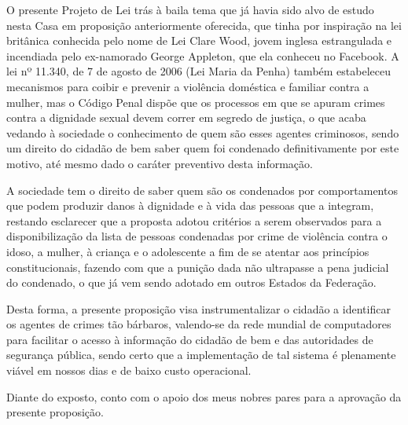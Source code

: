 \documentclass[10pt]{article}
\begin{document}
  
O presente Projeto de Lei trás à baila tema que já havia sido alvo de estudo nesta Casa em proposição anteriormente oferecida, que tinha por inspiração na lei britânica conhecida pelo nome de Lei Clare Wood, jovem inglesa estrangulada e incendiada pelo ex-namorado George Appleton, que ela conheceu no Facebook.    A lei nº 11.340, de 7 de agosto de 2006 (Lei Maria da Penha) também estabeleceu mecanismos para coibir e prevenir a violência doméstica e familiar contra a mulher, mas o Código Penal dispõe que os processos em que se apuram crimes contra a dignidade sexual devem correr em segredo de justiça, o que acaba vedando à sociedade o conhecimento de quem são esses agentes criminosos, sendo um direito do cidadão de bem saber quem foi condenado definitivamente por este motivo, até mesmo dado o caráter preventivo desta informação.

A sociedade tem o direito de saber quem são os condenados por comportamentos que podem produzir danos à dignidade e à vida das pessoas que a integram, restando esclarecer que a proposta adotou critérios a serem observados para a disponibilização da lista de pessoas condenadas por crime de violência contra o idoso, a mulher, à criança e o adolescente a fim de se atentar aos princípios constitucionais, fazendo com que a punição dada não ultrapasse a pena judicial do condenado, o que já vem sendo adotado em outros Estados da Federação.

Desta forma, a presente proposição visa instrumentalizar o cidadão a identificar os agentes de crimes tão bárbaros, valendo-se da rede mundial de computadores para facilitar o acesso à informação do cidadão de bem e das autoridades de segurança pública, sendo certo que a implementação de tal sistema é plenamente viável em nossos dias e de baixo custo operacional. 

Diante do exposto, conto com o apoio dos meus nobres pares para a aprovação da presente proposição.



\iffalse
\begin{center}
  \textbf{REFERÊNCIAS}
\end{center}


\fi
\end{document}
